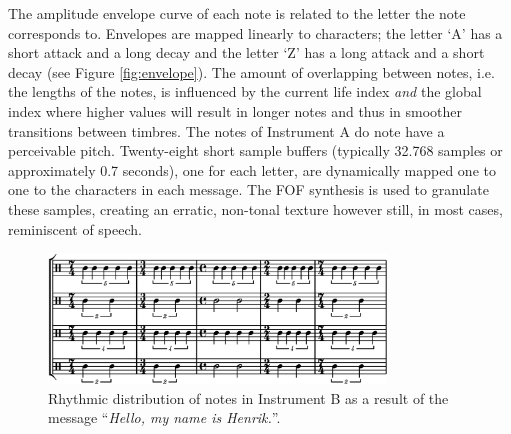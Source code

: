 The amplitude envelope curve of each note is related to the letter the note corresponds to. Envelopes are mapped linearly to characters; the letter `A' has a short attack and a long decay and the letter `Z' has a long attack and a short decay (see Figure \ref{fig:envelope}). The amount of overlapping between notes, i.e. the lengths of the notes, is influenced by the current life index \emph{and} the global index where higher values will result in longer notes and thus in smoother transitions between timbres. The notes of Instrument A do note have a perceivable pitch. Twenty-eight short sample buffers (typically 32.768 samples or approximately 0.7 seconds), one for each letter, are dynamically mapped one to one to the characters in each message. The FOF synthesis is used to granulate these samples, creating an erratic, non-tonal texture however still, in most cases, reminiscent of speech. 
\begin{figure}[!htb]
  \begin{center}
    \includegraphics[width=0.8\textwidth]{img/ethsnd/harm}
    \caption{Rhythmic distribution of notes in Instrument B as a
      result of the message ``\emph{Hello, my name is
        Henrik.}''.} \label{time2}
  \end{center}
\end{figure}

